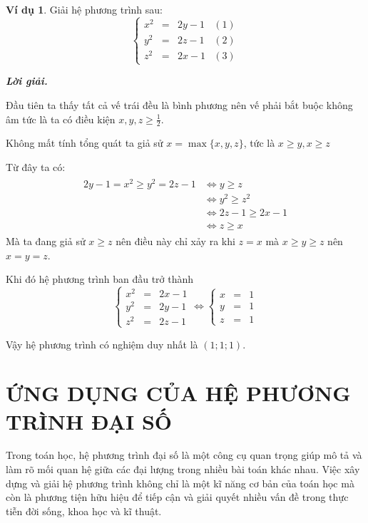 \documentclass[12pt,a4paper,oneside]{book}
\theoremstyle{theorem}
\theoremstyle{definition}
\newtheorem{vd}[theorem2]{Ví dụ}
\begin{document}
\begin{vd}
Giải hệ phương trình sau:
    \begin{equation}
        \left\{
\begin{array}{lclcl}
\displaystyle x^2&=& 2y-1&(1)\\[1.5ex]
\displaystyle y^2&=&2z-1&(2)\\[1.5ex]
\displaystyle z^2&=&2x-1&(3)
\end{array}
\right.
    \end{equation}

\textbf{\textit{Lời giải.}}

Đầu tiên ta thấy tất cả vế trái đều là bình phương nên vế phải bắt buộc không âm tức là ta có điều kiện $x,y,z\ge \displaystyle\frac{1}2$.

Không mất tính tổng quát ta giả sử $x=\max\{x,y,z\}$, tức là $x\ge y,x\ge z$

Từ đây ta có: 
\begin{align*}\begin{array}{llclclclcl}
   2y-1=x^2\ge y^2=2z-1
   &\Leftrightarrow y\ge z\\
  &\Leftrightarrow y^2\ge z^2\\
   &\Leftrightarrow 2z-1\ge2x-1\\
   &\Leftrightarrow z\ge x
\end{array}
\end{align*}
Mà ta đang giả sử $x\ge z$ nên điều này chỉ xảy ra khi $z=x$ 
mà $x\ge y\ge z$ nên $x=y=z$.

Khi đó hệ phương trình ban đầu trở thành
\[\left\{
\begin{array}{lclcl}
\displaystyle x^2&=& 2x-1\\[1.5ex]
\displaystyle y^2&=&2y-1\\[1.5ex]
\displaystyle z^2&=&2z-1
\end{array}
\right.\Longleftrightarrow\left\{
\begin{array}{lclcl}
\displaystyle x&=& 1\\[1.5ex]
\displaystyle y&=&1\\[1.5ex]
\displaystyle z&=&1
\end{array}
\right.\]

Vậy hệ phương trình có nghiệm duy nhất là $(1;1;1)$.
\end{vd}


 \chapter{ỨNG DỤNG CỦA HỆ PHƯƠNG TRÌNH ĐẠI SỐ}
Trong toán học, hệ phương trình đại số là một công cụ quan trọng giúp mô tả
và làm rõ mối quan hệ giữa các đại lượng trong nhiều bài toán khác nhau. Việc
xây dựng và giải hệ phương trình không chỉ là một kĩ năng cơ bản của toán học
mà còn là phương tiện hữu hiệu để tiếp cận và giải quyết nhiều vấn đề trong
thực tiễn đời sống, khoa học và kĩ thuật.
\end{document}
